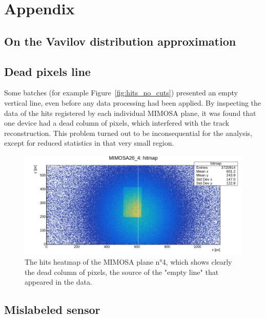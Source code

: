 \chapter{Appendix}\label{chap:appendix}


\section[Vavilov vs Landau distribution]{On the Vavilov distribution approximation}\label{sec:vavilov_vs_landau_distribution}

% 



\section{Dead pixels line}

Some batches (for example Figure~\ref{fig:hits_no_cuts}) presented an empty vertical line, even before any data processing had been applied. By inspecting the data of the hits registered by each individual MIMOSA plane, it was found that one device had a dead column of pixels, which interfered with the track reconstruction. This problem turned out to be inconsequential for the analysis, except for reduced statistics in that very small region.

\begin{figure}[h!tbp]
    \centering
    \includegraphics[width=.9\linewidth]{Images/appendix/hits_MIMOSA4.png}
    \caption{The hits heatmap of the MIMOSA plane n°4, which shows clearly the dead column of pixels, the source of the "empty line" that appeared in the data.}
    \label{fig:MIMOSA4_hits}
\end{figure}


\section{Mislabeled sensor}


